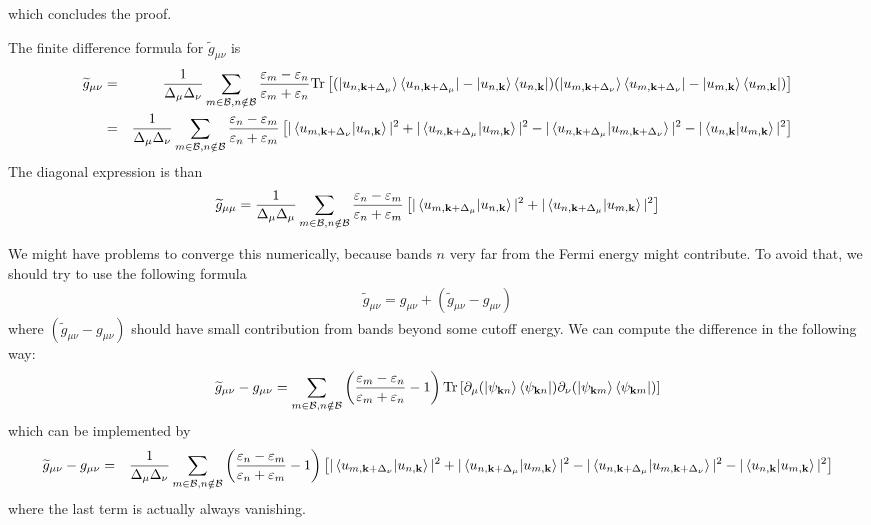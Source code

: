 \documentclass[onecolumn, prb,preprintnumbers,amsmath,amssymb,floatfix]{revtex4}
\newcommand{\vk}{{\mathbf{k}}}
\newcommand{\Tr}{\mathrm{Tr}} \newcommand{\npsi}{\underline{\psi}}
\newcommand{\cb}{{\cal B}}
\begin{document}
which concludes the proof.

The finite difference formula for $\widetilde{g}_{\mu\nu}$ is
\begin{eqnarray}
\widetilde{g}_{\mu\nu}&=&  \frac{1}{\Delta_\mu\Delta_\nu}\sum_{m\in\cb,n\notin\cb}\frac{\varepsilon_m-\varepsilon_n}{\varepsilon_m+\varepsilon_n}
  \Tr\left[
  (\ket{u_{n,\vk+\Delta_\mu}}\bra{u_{n,\vk+\Delta_\mu}}-\ket{u_{n,\vk}}\bra{u_{n,\vk}})
  (\ket{u_{m,\vk+\Delta_\nu}}\bra{u_{m,\vk+\Delta_\nu}}-\ket{u_{m,\vk}}\bra{u_{m,\vk}})
  \right] \nonumber\\
&=&\frac{1}{\Delta_\mu\Delta_\nu}
\sum_{m\in\cb,n\notin\cb}\frac{\varepsilon_n-\varepsilon_m}{\varepsilon_n+\varepsilon_m}
  \left[
    |\braket{u_{m,\vk+\Delta_\nu}|u_{n,\vk}}|^2
    +|\braket{u_{n,\vk+\Delta_\mu}|u_{m,\vk}}|^2
    -|\braket{u_{n,\vk+\Delta_\mu}|u_{m,\vk+\Delta_\nu}}|^2
    -|\braket{u_{n,\vk}|u_{m,\vk}}|^2
  \right]
\nonumber
\end{eqnarray}  
The diagonal expression is than
\begin{eqnarray}
  \widetilde{g}_{\mu\mu}=
\frac{1}{\Delta_\mu\Delta_\mu}
\sum_{m\in\cb,n\notin\cb}\frac{\varepsilon_n-\varepsilon_m}{\varepsilon_n+\varepsilon_m}
  \left[
    |\braket{u_{m,\vk+\Delta_\mu}|u_{n,\vk}}|^2
    +|\braket{u_{n,\vk+\Delta_\mu}|u_{m,\vk}}|^2
  \right]
\end{eqnarray}  


We might have problems to converge this numerically, because bands $n$
very far from the Fermi energy might contribute. To avoid that, we
should try to use the following formula
\begin{eqnarray}
  \widetilde{g}_{\mu\nu}= g_{\mu\nu} + (\widetilde{g}_{\mu\nu}-g_{\mu\nu})
\end{eqnarray}
where $(\widetilde{g}_{\mu\nu}-g_{\mu\nu})$ should have small
contribution from bands beyond some cutoff energy. We can compute the
difference in the following way:
\begin{eqnarray}
  \widetilde{g}_{\mu\nu}-g_{\mu\nu}=  \sum_{m\in\cb,n\notin\cb}
  \left(\frac{\varepsilon_m-\varepsilon_n}{\varepsilon_m+\varepsilon_n}-1\right)
  \Tr\left[ \partial_\mu(\ket{\psi_{\vk n}}\bra{\psi_{\vk n}})  \partial_\nu (\ket{\psi_{\vk m}}\bra{\psi_{\vk m}})
  \right]
\end{eqnarray}  
which can be implemented by
\begin{eqnarray}
  \widetilde{g}_{\mu\nu}-g_{\mu\nu}&=&
  \frac{1}{\Delta_\mu\Delta_\nu}
\sum_{m\in\cb,n\notin\cb}\left(\frac{\varepsilon_n-\varepsilon_m}{\varepsilon_n+\varepsilon_m}-1\right)
  \left[
    |\braket{u_{m,\vk+\Delta_\nu}|u_{n,\vk}}|^2
    +|\braket{u_{n,\vk+\Delta_\mu}|u_{m,\vk}}|^2
    -|\braket{u_{n,\vk+\Delta_\mu}|u_{m,\vk+\Delta_\nu}}|^2 
    -|\braket{u_{n,\vk}|u_{m,\vk}}|^2
  \right]
\nonumber
\end{eqnarray}  
where the last term is actually always vanishing.
\end{document}

